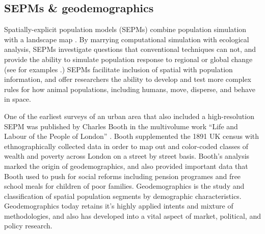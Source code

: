 \documentclass[draft]{article}
\begin{document}
\subsection{SEPMs \& geodemographics} %


Spatially-explicit population models (SEPMs) combine population simulation with a landscape map \cite{dunning95}.  By marrying computational simulation with ecological analysis, SEPMs investigate questions that conventional techniques can not, and provide the ability to simulate population response to regional or global change (see for examples \cite{levin92, ray09, chandler13}.)  SEPMs facilitate inclusion of spatial with population information, and offer researchers the ability to develop and test more complex rules for how animal populations, including humans, move, disperse, and behave in space.

One of the earliest surveys of an urban area that also included a high-resolution SEPM %
was published by Charles Booth in the multivolume work ``Life and Labour of the People of London'' \cite{booth1892}.  Booth supplemented the 1891 UK census with ethnographically collected data in order to map out and color-coded classes of wealth and poverty across London on a street by street basis.  Booth's analysis marked the origin of geodemographics, and also provided important data that Booth used to push for social reforms including pension programes and free school meals for children of poor families.  Geodemographics is the study and classification of spatial population segments by demographic characteristics.  Geodemographics today retains it's highly applied intents and mixture of methodologies, and also has developed into a vital aspect of market, political, and policy research.  %
\end{document}

